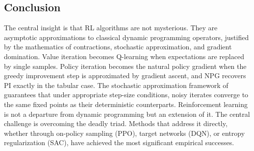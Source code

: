\subsection{Conclusion}
\label{sec:ch2_conclusion}

The central insight is that RL algorithms are not mysterious. They are asymptotic approximations to classical dynamic programming operators, justified by the mathematics of contractions, stochastic approximation, and gradient domination. Value iteration becomes Q-learning when expectations are replaced by single samples. Policy iteration becomes the natural policy gradient when the greedy improvement step is approximated by gradient ascent, and NPG recovers PI exactly in the tabular case. The stochastic approximation framework of \citet{Robbins1952} guarantees that under appropriate step-size conditions, noisy iterates converge to the same fixed points as their deterministic counterparts. Reinforcement learning is not a departure from dynamic programming but an extension of it. The central challenge is overcoming the deadly triad. Methods that address it directly, whether through on-policy sampling (PPO), target networks (DQN), or entropy regularization (SAC), have achieved the most significant empirical successes.


